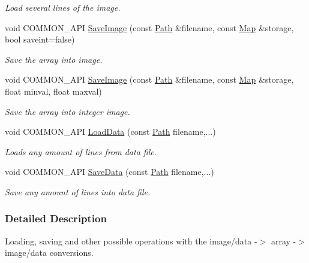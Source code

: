 \begin{DoxyCompactItemize}
\begin{DoxyCompactList}\small\item\em Load several lines of the image. \item\end{DoxyCompactList}\item 
void COMMON\_\-API \hyperlink{group__IO_gae45e74b44be3e797bcf1f2ae84d211ef}{SaveImage} (const \hyperlink{classPath}{Path} \&filename, const \hyperlink{group__Types_ga8747378c016fc11d9ecbb98787248c25}{Map} \&storage, bool saveint=false)
\begin{DoxyCompactList}\small\item\em Save the array into image. \item\end{DoxyCompactList}\item 
void COMMON\_\-API \hyperlink{group__IO_gada3965acc5403b0ac1816014b6d079c0}{SaveImage} (const \hyperlink{classPath}{Path} \&filename, const \hyperlink{group__Types_ga8747378c016fc11d9ecbb98787248c25}{Map} \&storage, float minval, float maxval)
\begin{DoxyCompactList}\small\item\em Save the array into integer image. \item\end{DoxyCompactList}\item 
void COMMON\_\-API \hyperlink{group__IO_ga02288ddbc5eb5144a7a92eb0a06ee1b6}{LoadData} (const \hyperlink{classPath}{Path} filename,...)
\begin{DoxyCompactList}\small\item\em Loads any amount of lines from data file. \item\end{DoxyCompactList}\item 
void COMMON\_\-API \hyperlink{group__IO_ga0f88c53b648824e6db8e2dc716d273f0}{SaveData} (const \hyperlink{classPath}{Path} filename,...)
\begin{DoxyCompactList}\small\item\em Save any amount of lines into data file. \item\end{DoxyCompactList}\end{DoxyCompactItemize}


\subsubsection{Detailed Description}
Loading, saving and other possible operations with the image/data -\/$>$ array -\/$>$ image/data conversions. 


